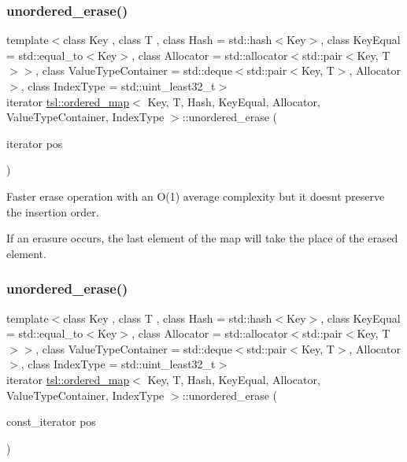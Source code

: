 \subsubsection{\texorpdfstring{unordered\_erase()}{unordered\_erase()}\hspace{0.1cm}{\footnotesize\ttfamily [1/6]}}
{\footnotesize\ttfamily template$<$class Key , class T , class Hash  = std\+::hash$<$\+Key$>$, class Key\+Equal  = std\+::equal\+\_\+to$<$\+Key$>$, class Allocator  = std\+::allocator$<$std\+::pair$<$\+Key, T$>$$>$, class Value\+Type\+Container  = std\+::deque$<$std\+::pair$<$\+Key, T$>$, Allocator$>$, class Index\+Type  = std\+::uint\+\_\+least32\+\_\+t$>$ \\
iterator \mbox{\hyperlink{classtsl_1_1ordered__map}{tsl\+::ordered\+\_\+map}}$<$ Key, T, Hash, Key\+Equal, Allocator, Value\+Type\+Container, Index\+Type $>$\+::unordered\+\_\+erase (\begin{DoxyParamCaption}\item[{iterator}]{pos }\end{DoxyParamCaption})\hspace{0.3cm}{\ttfamily [inline]}}

Faster erase operation with an O(1) average complexity but it doesn\textquotesingle{}t preserve the insertion order.

If an erasure occurs, the last element of the map will take the place of the erased element. \mbox{\label{classtsl_1_1ordered__map_a9c6f37116d357f665108c43c67b4d0df}} 
\subsubsection{\texorpdfstring{unordered\_erase()}{unordered\_erase()}\hspace{0.1cm}{\footnotesize\ttfamily [2/6]}}
{\footnotesize\ttfamily template$<$class Key , class T , class Hash  = std\+::hash$<$\+Key$>$, class Key\+Equal  = std\+::equal\+\_\+to$<$\+Key$>$, class Allocator  = std\+::allocator$<$std\+::pair$<$\+Key, T$>$$>$, class Value\+Type\+Container  = std\+::deque$<$std\+::pair$<$\+Key, T$>$, Allocator$>$, class Index\+Type  = std\+::uint\+\_\+least32\+\_\+t$>$ \\
iterator \mbox{\hyperlink{classtsl_1_1ordered__map}{tsl\+::ordered\+\_\+map}}$<$ Key, T, Hash, Key\+Equal, Allocator, Value\+Type\+Container, Index\+Type $>$\+::unordered\+\_\+erase (\begin{DoxyParamCaption}\item[{const\+\_\+iterator}]{pos }\end{DoxyParamCaption})\hspace{0.3cm}{\ttfamily [inline]}}





